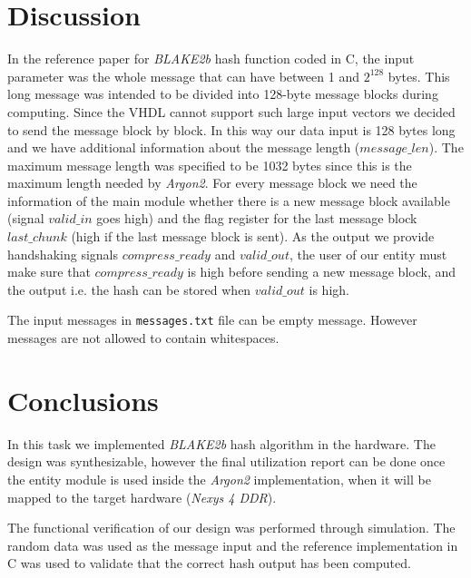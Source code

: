 \documentclass[%
	a4paper,
]
{article}
\begin{document}
\section{Discussion}
\label{sec:discussion}
In the reference paper \autocite{rfc7693} for \emph{BLAKE2b} hash function
coded in C, the input parameter was the whole message that can have between 1
and $2^{128}$ bytes. This long message was intended to be divided into
128-byte message blocks during computing. Since the VHDL cannot support such
large input vectors we decided to send the message block by block. In this way
our data input is 128 bytes long and we have additional information about the
message length ($message\_len$). The maximum message length was specified to
be 1032 bytes since this is the maximum length needed by \emph{Argon2}. For
every message block we need the information of the main module whether there
is a new message block available (signal $valid\_in$ goes high) and the flag
register for the last message block $last\_chunk$ (high if the last message
block is sent). As the output we provide handshaking signals $compress\_ready$
and $valid\_out$, the user of our entity must make sure that $compress\_ready$
is high before sending a new message block, and the output i.e. the hash can
be stored when $valid\_out$ is high.

The input messages in \texttt{messages.txt} file can be empty message. However
messages are not allowed to contain whitespaces.
%
\section{Conclusions}
\label{sec:conclusions}

In this task we implemented \emph{BLAKE2b} hash algorithm in the hardware. The
design was synthesizable, however the final utilization report can be done
once the entity module is used inside the \emph{Argon2} implementation, when
it will be mapped to the target hardware (\emph{Nexys 4 DDR}). 

The functional verification of our design was performed through simulation.
The random data was used as the message input and the reference implementation
in C was used to validate that the correct hash output has been computed.
%
%
%
\printbibliography
%
%
\end{document}
